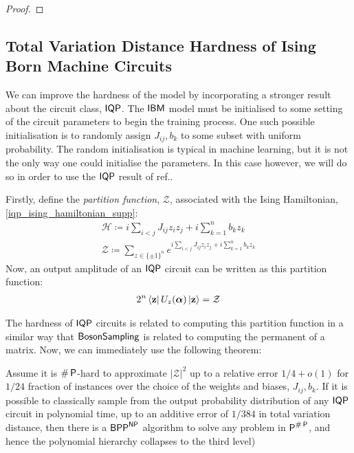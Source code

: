 \begin{proof}
\end{proof}

\subsection{Total Variation Distance Hardness of Ising Born Machine Circuits \label{supp_matt:ibm_variation_hardness}}

We can improve the hardness of the model by incorporating a stronger result about the circuit class, $\operatorname{\textsf{IQP}}$. The $\textsf{IBM}$ model must be initialised to some setting of the circuit parameters to begin the training process. One such possible initialisation is to randomly assign $J_{ij}, b_{k}$ to some subset with uniform probability. The random initialisation is typical in machine learning, but it is not the only way one could initialise the parameters. In this case however, we will do so in order to use the $\operatorname{\textsf{IQP}}$ result of ref..

Firstly, define the \textit{partition function},  $\mathcal{Z}$, associated with the Ising Hamiltonian, \eqref{iqp_ising_hamiltonian_supp}:
\begin{align}
 \mathcal{H}  \coloneqq i\sum\limits_{i<j} J_{ij}z_iz_j + i\sum\limits_{k=1}^n b_k z_k \label{iqp_ising_hamiltonian_supp}\\
    \mathcal{Z}  \coloneqq \sum\limits_{z\in\{\pm 1\}^n}e^{  i\sum\limits_{i<j} J_{ij}z_iz_j + i\sum\limits_{k=1}^n b_k z_k} \label{iqp_isingpartition_fun_supp}
\end{align}
Now, an output amplitude of an $\operatorname{\textsf{IQP}}$ circuit can be written as this partition function:
\begin{align}
    2^n\bra{\mathbf{z}}U_z(\boldsymbol\alpha)\ket{\mathbf{z}} = \mathcal{Z}
\end{align} 

The hardness of $\operatorname{\textsf{IQP}}$ circuits is related to computing this partition function in a similar way that $\operatorname{\textsf{BosonSampling}}$ is related to computing the permanent of a matrix.
Now, we can immediately use the following theorem:

\begin{theorem} 
\label{thm:iqphardnessbremneradditive}
    Assume it is $\#\operatorname{\textsf{P}}$-hard to approximate $|\mathcal{Z}|^2$ up to a relative error  $1/4+o(1)$ for $1/24$ fraction of instances over the choice of the weights and biases, $J_{ij}, b_k$. If it is possible to classically sample from the output probability distribution of any $\operatorname{\textsf{IQP}}$ circuit in polynomial time, up to an additive error of $1/384$ in total variation distance, then there is a $\textsf{BPP}^{\operatorname{\textsf{NP}}}$ algorithm to solve any problem in $\operatorname{\textsf{P}}^{\#\operatorname{\textsf{P}}}$, and hence the polynomial hierarchy collapses to the third level)
\end{theorem}


